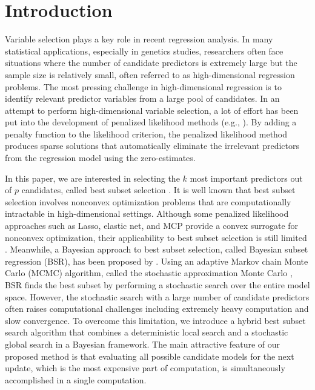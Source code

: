 \section{Introduction}\label{sec:1}




Variable selection plays a key role in recent regression analysis. In many statistical applications, especially in genetics studies, researchers often face situations where the number of candidate predictors is extremely large but the sample size is relatively small, often referred to as high-dimensional regression problems. The most pressing challenge in high-dimensional regression is to identify relevant predictor variables from a large pool of candidates. In an attempt to perform high-dimensional variable selection, a lot of effort has been put into the development of penalized likelihood methods (e.g., \citealt{tibshirani1996regression, fan2001variable, zou2005regularization, zhang2010nearly}). By adding a penalty function to the likelihood criterion, the penalized likelihood method produces sparse solutions that automatically eliminate the irrelevant predictors from the regression model using the zero-estimates.

In this paper, we are interested in selecting the $k$ most important predictors out of $p$ candidates, called best subset selection \citep{hocking1967selection}. It is well known that best subset selection involves nonconvex optimization problems that are computationally intractable in high-dimensional settings. Although some penalized likelihood approaches such as Lasso, elastic net, and MCP provide a convex surrogate for nonconvex optimization, their applicability to best subset selection is still limited \citep{bertsimas2016best}. Meanwhile, a Bayesian approach to best subset selection, called Bayesian subset regression (BSR), has been proposed by \citet{liang:2013bayesian}. Using an adaptive Markov chain Monte Carlo (MCMC) algorithm, called the stochastic approximation Monte Carlo \citep{liang2007stochastic}, BSR finds the best subset by performing a stochastic search over the entire model space. However, the stochastic search with a large number of candidate predictors often raises computational challenges including extremely heavy computation and slow convergence. To overcome this limitation, we introduce a hybrid best subset search algorithm that combines a deterministic local search and a stochastic global search in a Bayesian framework. The main attractive feature of our proposed method is that evaluating all possible candidate models for the next update, which is the most expensive part of computation, is simultaneously accomplished in a single computation.
